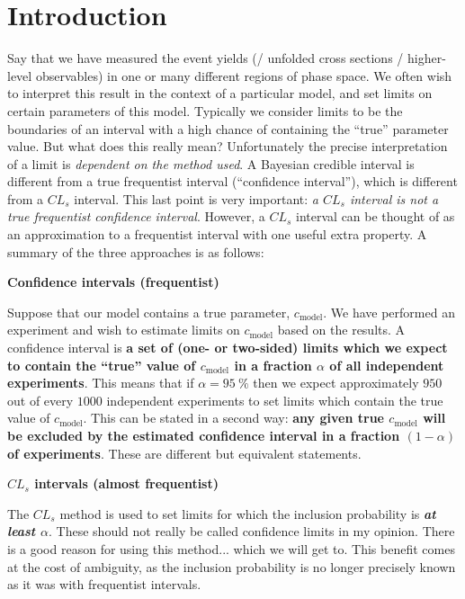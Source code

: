 \section{Introduction} \label{S. Introduction}

Say that we have measured the event yields (/ unfolded cross sections / higher-level observables) in one or many different regions of phase space. We often wish to interpret this result in the context of a particular model, and set limits on certain parameters of this model. Typically we consider limits to be the boundaries of an interval with a high chance of containing the ``true'' parameter value. But what does this really mean? Unfortunately the precise interpretation of a limit is \textit{dependent on the method used}. A Bayesian credible interval is different from a true frequentist interval (``confidence interval''), which is different from a $\textit{CL}_s$ interval. This last point is very important: \textit{a $\textit{CL}_s$ interval is not a true frequentist confidence interval}. However, a $\textit{CL}_s$ interval can be thought of as an approximation to a frequentist interval with one useful extra property. A summary of the three approaches is as follows:

\vspace{0.5cm}
\noindent \textbf{Confidence intervals (frequentist)}
\vspace{0.5cm}

Suppose that our model contains a true parameter, $c_\text{model}$. We have performed an experiment and wish to estimate limits on $c_\text{model}$ based on the results. A confidence interval is \textbf{a set of (one- or two-sided) limits which we expect to contain the ``true'' value of $c_\text{model}$ in a fraction $\alpha$ of all independent experiments}. This means that if $\alpha=95~\%$ then we expect approximately $950$ out of every $1000$ independent experiments to set limits which contain the true value of $c_\text{model}$. This can be stated in a second way: \textbf{any given true $c_\text{model}$ will be excluded by the estimated confidence interval in a fraction $(1-\alpha)$ of experiments}. These are different but equivalent statements.

\newpage
\noindent \textbf{$\textit{CL}_s$ intervals (almost frequentist)}
\vspace{0.5cm}

The $\textit{CL}_s$ method is used to set limits for which the inclusion probability is \textbf{\emph{at least $\alpha$}}. These should not really be called confidence limits in my opinion. There is a good reason for using this method... which we will get to. This benefit comes at the cost of ambiguity, as the inclusion probability is no longer precisely known as it was with frequentist intervals.

